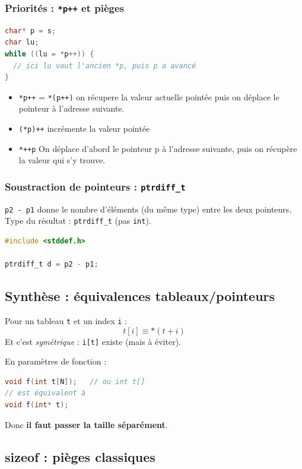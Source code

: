 \subsubsection{Priorités : \texttt{*p++} et pièges}
\begin{lstlisting}[language=C]
char* p = s;
char lu;
while ((lu = *p++)) {
  // ici lu vaut l'ancien *p, puis p a avancé
}
\end{lstlisting}

\begin{itemize}
  \item \texttt{*p++} = \texttt{*(p++)} \to on récupere la valeur actuelle pointée puis on déplace le pointeur à l'adresse suivante.
  \item \texttt{(*p)++} incrémente la valeur pointée
  \item \texttt{*++p} On déplace d'abord le pointeur p à l'adresse suivante, puis on récupère la valeur qui s'y trouve.
\end{itemize}

\subsubsection{Soustraction de pointeurs : \texttt{ptrdiff\_t}}
\texttt{p2 - p1} donne le nombre d'éléments (du même type) entre les deux pointeurs.
Type du résultat : \texttt{ptrdiff\_t} (pas \texttt{int}).

\begin{lstlisting}[language=C]
#include <stddef.h>

ptrdiff_t d = p2 - p1;
\end{lstlisting}

\subsection{Synthèse : équivalences tableaux/pointeurs}
Pour un tableau \texttt{t} et un index \texttt{i} :
\[
  t[i] \equiv *(t+i)
\]
Et c'est \textit{symétrique} : \texttt{i[t]} existe (mais à éviter).

En paramètres de fonction :
\begin{lstlisting}[language=C]
void f(int t[N]);   // ou int t[]
// est équivalent à
void f(int* t);
\end{lstlisting}
Donc \textbf{il faut passer la taille séparément}.

\subsection{sizeof : pièges classiques}
